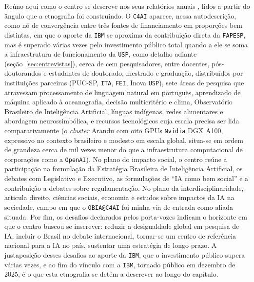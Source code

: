 Reúno aqui como o centro se descreve nos seus relatórios anuais \parencite{C4AI2021, C4AI2022, C4AI2023, C4AI2024, C4AI2025}, lidos a partir do ângulo que a etnografia foi construindo. O \texttt{C4AI} aparece, nessa autodescrição, como nó de convergência entre três fontes de financiamento em proporções bem distintas, em que o aporte da \texttt{IBM} se aproxima da contribuição direta da \texttt{FAPESP}, mas é superado várias vezes pelo investimento público total quando a ele se soma a infraestrutura de funcionamento da \texttt{USP}, como detalho adiante (seção~\ref{sec:entrevistas}), cerca de cem pesquisadores, entre docentes, pós-doutorandos e estudantes de doutorado, mestrado e graduação, distribuídos por instituições parceiras (PUC-SP, \texttt{ITA}, \texttt{FEI}, Inova \texttt{USP}), sete áreas de pesquisa que atravessam processamento de linguagem natural em português, aprendizado de máquina aplicado à oceanografia, decisão multicritério e clima, Observatório Brasileiro de Inteligência Artificial, línguas indígenas, redes alimentares e abordagem neurossimbólica, e recursos tecnológicos cuja escala precisa ser lida comparativamente (o \textit{cluster} Arandu com oito GPUs \texttt{Nvidia} DGX A100, expressivo no contexto brasileiro e modesto em escala global, situa-se em ordem de grandeza cerca de mil vezes menor do que a infraestrutura computacional de corporações como a \texttt{OpenAI}). No plano do impacto social, o centro reúne a participação na formulação da Estratégia Brasileira de Inteligência Artificial, os debates com Legislativo e Executivo, as formulações de \enquote{IA como bem social} e a contribuição a debates sobre regulamentação. No plano da interdisciplinaridade, articula direito, ciências sociais, economia e estudos sobre impactos da IA na sociedade, campo em que o \texttt{OBIA@C4AI} foi minha via de entrada como aliada situada. Por fim, os desafios declarados pelos porta-vozes indicam o horizonte em que o centro buscou se inscrever: reduzir a desigualdade global em pesquisa de IA, incluir o Brasil no debate internacional, tornar-se um centro de referência nacional para a IA no país, sustentar uma estratégia de longo prazo. A justaposição desses desafios ao aporte da \texttt{IBM}, que o investimento público supera várias vezes, e ao fim do vínculo com a \texttt{IBM}, tornado público em dezembro de 2025, é o que esta etnografia se detém a descrever ao longo do capítulo.

